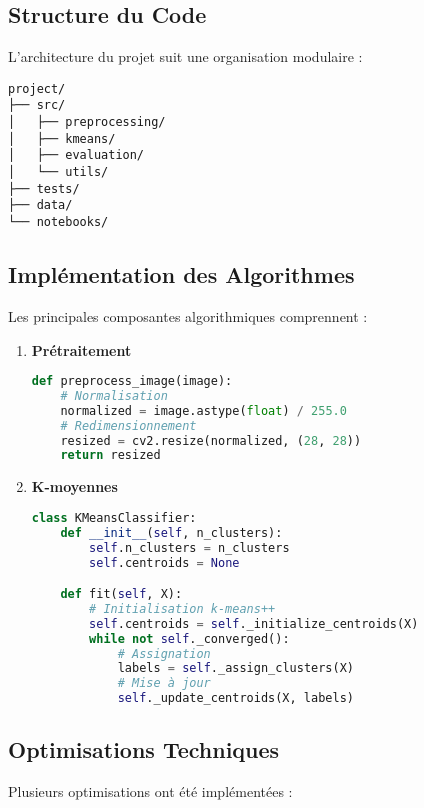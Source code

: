 \subsection{Structure du Code}
L'architecture du projet suit une organisation modulaire :

\begin{verbatim}
project/
├── src/
│   ├── preprocessing/
│   ├── kmeans/
│   ├── evaluation/
│   └── utils/
├── tests/
├── data/
└── notebooks/
\end{verbatim}

\subsection{Implémentation des Algorithmes}
Les principales composantes algorithmiques comprennent :

\begin{enumerate}
    \item \textbf{Prétraitement}
    \begin{lstlisting}[language=Python]
def preprocess_image(image):
    # Normalisation
    normalized = image.astype(float) / 255.0
    # Redimensionnement
    resized = cv2.resize(normalized, (28, 28))
    return resized
    \end{lstlisting}

    \item \textbf{K-moyennes}
    \begin{lstlisting}[language=Python]
class KMeansClassifier:
    def __init__(self, n_clusters):
        self.n_clusters = n_clusters
        self.centroids = None

    def fit(self, X):
        # Initialisation k-means++
        self.centroids = self._initialize_centroids(X)
        while not self._converged():
            # Assignation
            labels = self._assign_clusters(X)
            # Mise à jour
            self._update_centroids(X, labels)
    \end{lstlisting}
\end{enumerate}

\subsection{Optimisations Techniques}
Plusieurs optimisations ont été implémentées :

